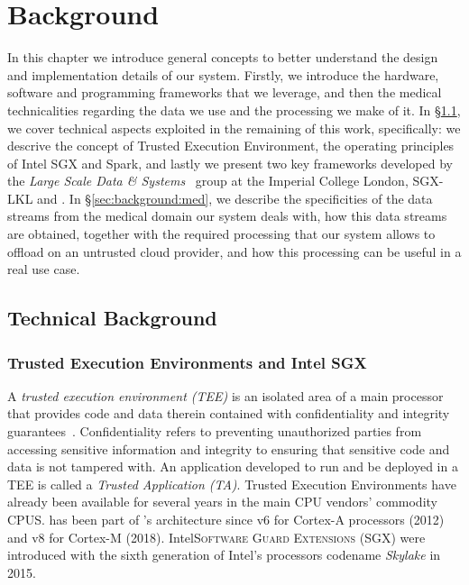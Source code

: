 \chapter{Background} \label{chap:background}

In this chapter we introduce general concepts to better understand the design and implementation details of our system.
Firstly, we introduce the hardware, software and programming frameworks that we leverage, and then the medical technicalities regarding the data we use and the processing we make of it.
In \S\ref{sec:background:tech}, we cover technical aspects exploited in the remaining of this work, specifically: we descrive the concept of Trusted Execution Environment, the operating principles of Intel SGX and Spark, and lastly we present two key frameworks developed by the \textit{Large Scale Data \& Systems}~\cite{lsds} group at the Imperial College London, \textsc{SGX-LKL} and \sgxspark.
In \S\ref{sec:background:med}, we describe the specificities of the data streams from the medical domain our system deals with, how this data streams are obtained, together with the required processing that our system allows to offload on an untrusted cloud provider, and how this processing can be useful in a real use case.

\section{Technical Background} \label{sec:background:tech}

\subsection{Trusted Execution Environments and Intel SGX}
A \emph{trusted execution environment (TEE)} is an isolated area of a main processor that provides code and data therein contained with confidentiality and integrity guarantees~\cite{tee-globalplatform}. 
Confidentiality refers to preventing unauthorized parties from accessing sensitive information and integrity to ensuring that sensitive code and data is not tampered with.
An application developed to run and be deployed in a TEE is called a \emph{Trusted Application (TA)}.
Trusted Execution Environments have already been available for several years in the main CPU vendors' commodity CPUS.
\arm \tz has been part of \arm's architecture since v6 for Cortex-A processors (2012) and v8 for Cortex-M (2018).
Intel\textregistered\xspace \textsc{Software Guard Extensions (SGX)} were introduced with the sixth generation of Intel's processors codename \textit{Skylake} in 2015.

